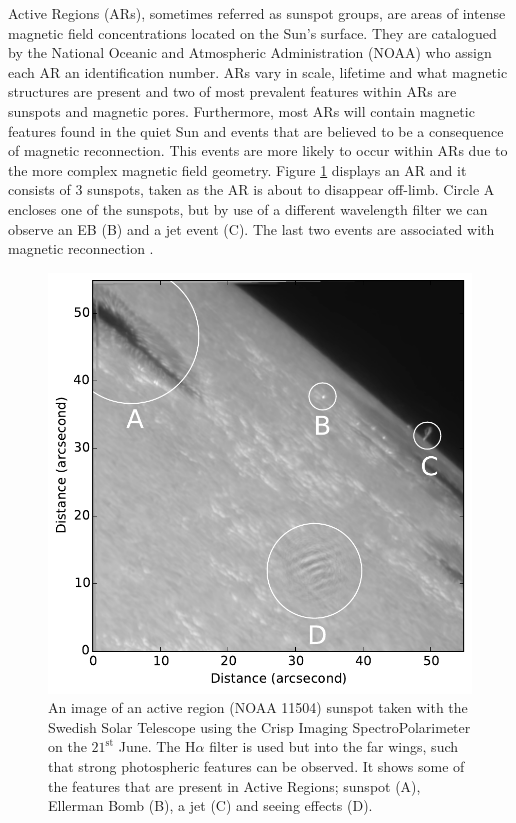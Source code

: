     Active Regions (ARs), sometimes referred as sunspot groups, are areas of intense magnetic field concentrations located on the Sun's surface.
    They are catalogued by the National Oceanic and Atmospheric Administration (NOAA) who assign each AR an identification number.
    ARs vary in scale, lifetime and what magnetic structures are present and two of most prevalent features within ARs are sunspots and magnetic pores.
    Furthermore, most ARs will contain magnetic features found in the quiet Sun and events that are believed to be a consequence of magnetic reconnection.
    This events are more likely to occur within ARs due to the more complex magnetic field geometry.
    Figure \ref{fig:AR} displays an AR and it consists of 3 sunspots, taken as the AR is about to disappear off-limb.
    Circle A encloses one of the sunspots, but by use of a different wavelength filter we can observe an EB (B) and a jet event (C).
    The last two events are associated with magnetic reconnection \citep{2013SoPh..283..307N,2013A&A...560A..31N,2013ApJ...779..125N,2015ApJ...798...19N}.
     
    \begin{figure}
        \centering
        \includegraphics[width=\textwidth]{AR.pdf}
        \caption{
                 An image of an active region (NOAA 11504) sunspot taken with the Swedish Solar Telescope using the Crisp Imaging SpectroPolarimeter on the $21^{\mathrm{st}}$ June. 
                 The H$\alpha$ filter is used but into the far wings, such that strong photospheric features can be observed.
                 It shows some of the features that are present in Active Regions; sunspot (A), Ellerman Bomb (B), a jet (C) and seeing effects (D).
                }
        \label{fig:AR}
     \end{figure}    

